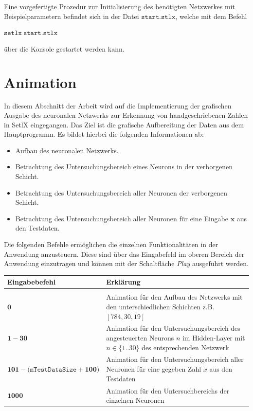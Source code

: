 \noindent
Eine vorgefertigte Prozedur zur Initialisierung des benötigten Netzwerkes mit Beispielparametern befindet sich in der Datei $\mathtt{start.stlx}$, welche mit dem Befehl 
\begin{center}
	$\mathtt{setlx\ start.stlx}$ 
\end{center}
über die Konsole gestartet werden kann.

\section{Animation}
In diesem Abschnitt der Arbeit wird auf die Implementierung der grafischen Ausgabe des neuronalen Netzwerks zur Erkennung von handgeschriebenen Zahlen in SetlX eingegangen. Das Ziel ist die grafische Aufbereitung der Daten aus dem Hauptprogramm. Es bildet hierbei die folgenden Informationen ab: 
\begin{itemize}
\item Aufbau des neuronalen Netzwerks.
\item Betrachtung des Untersuchungsbereich eines Neurons in der verborgenen Schicht.
\item Betrachtung des Untersuchungsbereich aller Neuronen der verborgenen Schicht.
\item Betrachtung des Untersuchungsbereich aller Neuronen für eine Eingabe $\mathbf{x}$ aus den Testdaten.
\end{itemize}
\vspace{0.5cm}
\noindent
Die folgenden Befehle ermöglichen die einzelnen Funktionalitäten in der Anwendung anzusteuern. Diese sind über das Eingabefeld im oberen Bereich der Anwendung einzutragen und können mit der Schaltfläche \textit{Play} ausgeführt werden.
\begin{center}
\begin{tabular}{lp{8cm}}
\textbf{Eingabebefehl}   & \textbf{Erklärung} \\
\hline \\
$\mathbf{0}$      & Animation für den Aufbau des Netzwerks mit den unterschiedlichen Schichten z.B. $[784,30,19]$  \\[0.2cm]
$\mathbf{1-30}$   & Animation für den Untersuchungsbereich des angesteuerten Neurons $n$ im Hidden-Layer mit $n \in \{1..30\}$ des entsprechenden Netzwerk  \\[0.2cm]
$\mathbf{101-(\mathtt{mTestDataSize}+100})$  & Animation für den Untersuchungsbereich aller Neuronen für eine gegeben Zahl $x$ aus den Testdaten  \\[0.2cm]
$\mathbf{1000}$   & Animation für den Untersuchbereichs der einzelnen Neuronen  \\
\end{tabular}
\end{center}
\vspace{0.5cm}

